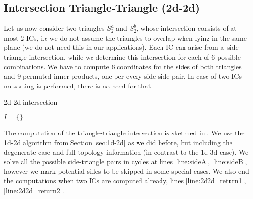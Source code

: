 \subsection{Intersection Triangle-Triangle (2d-2d)}
Let us now consider two triangles $S^a_2$ and $S^b_2$, whose intersection consists of at most 2 ICs,
i.e we do not assume the triangles to overlap when lying in the same plane (we do not need this in our applications).
Each IC can arise from a~side-triangle intersection, while we determine this intersection for each of 6 possible combinations.
We have to compute 6 \plucker coordinates for the sides of both triangles and 9 permuted inner products, one per every side-side pair.
In case of two ICs no sorting is performed, there is no need for that.

\begin{algorithm}
  \caption{2d-2d intersection}
  \label{algo:22d}

  \DontPrintSemicolon
  $I=\{\}$\; 
\end{algorithm}

The computation of the triangle-triangle intersection is sketched in .
We use the 1d-2d algorithm from Section \ref{sec:1d-2d} as we did before, but including the degenerate case and
full topology information (in contrast to the 1d-3d case).
We solve all the possible side-triangle pairs in cycles at lines \ref{line:sideA}, \ref{line:sideB},
however we mark potential sides to be skipped in some special cases.
We also end the computations when two ICs are computed already, lines \ref{line:2d2d_return1}, \ref{line:2d2d_return2}.

